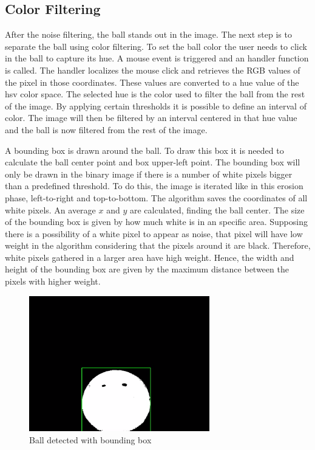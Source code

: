 \subsection{Color Filtering}

After the noise filtering, the ball stands out in the image. The next step is to separate the ball using color filtering. To set the ball color the user needs to click in the ball to capture its hue. A mouse event is triggered and an handler function is called. The handler localizes the mouse click and retrieves the RGB values of the pixel in those coordinates. These values are converted to a hue value of the \gls{hsv} color space. The selected hue is the color used to filter the ball from the rest of the image. By applying certain thresholds it is possible to define an interval of color. The image will then be filtered by an interval centered in that hue value and the ball is now filtered from the rest of the image. 

A bounding box is drawn around the ball. To draw this box it is needed to calculate the ball center point and box upper-left point. The bounding box will only be drawn in the binary image if there is a number of white pixels bigger than a predefined threshold. To do this, the image is iterated like in this erosion phase, left-to-right and top-to-bottom. The algorithm saves the coordinates of all white pixels. An average $x$ and $y$ are calculated, finding the ball center. The size of the bounding box is given by how much white is in an specific area. Supposing there is a possibility of a white pixel to appear as noise, that pixel will have low weight in the algorithm considering that the pixels around it are black. Therefore, white pixels gathered in a larger area have high weight. Hence, the width and height of the bounding box are given by the maximum distance between the pixels with higher weight.


\begin{figure}[htp]
	
	\centering
	\includegraphics[width=0.7\textwidth]{capcalib/imgs/ball_detect.png}
	
	\caption{Ball detected with bounding box}
	\label{fig:balldetect}
	
\end{figure}

